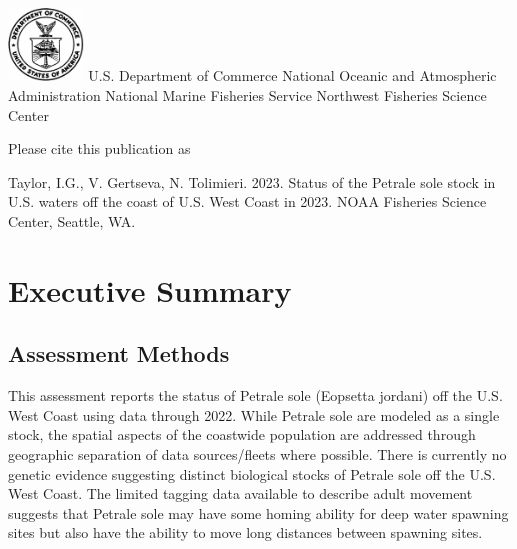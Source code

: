 \documentclass[
]{scrartcl}
\renewcommand*\contentsname{Table of contents}
\newcommand\contentsname{Table of contents}
\begin{document}
\begin{titlepage}
\begin{minipage}[b][\textheight][s]{\textwidth}
  \vspace{1\baselineskip}

  \includegraphics[width=2cm]{support_files/us_doc_logo.png}\newline
  U.S. Department of Commerce\newline
  National Oceanic and Atmospheric Administration\newline
  National Marine Fisheries Service\newline
  Northwest Fisheries Science Center\newline

  \end{minipage}
  \restoregeometry
  \end{titlepage}

\renewcommand*\contentsname{Table of contents}
{
\hypersetup{linkcolor=.}
\setcounter{tocdepth}{3}
\tableofcontents
}
\listoffigures
\listoftables
\newpage{}

Please cite this publication as

Taylor, I.G., V. Gertseva, N. Tolimieri. 2023. Status of the Petrale
sole stock in U.S. waters off the coast of U.S. West Coast in 2023. NOAA
Fisheries Science Center, Seattle, WA.

\newpage{}

\section{Executive Summary}\label{executive-summary}

\subsection{Assessment Methods}\label{assessment-methods}

This assessment reports the status of Petrale sole (Eopsetta jordani)
off the U.S. West Coast using data through 2022. While Petrale sole are
modeled as a single stock, the spatial aspects of the coastwide
population are addressed through geographic separation of data
sources/fleets where possible. There is currently no genetic evidence
suggesting distinct biological stocks of Petrale sole off the U.S. West
Coast. The limited tagging data available to describe adult movement
suggests that Petrale sole may have some homing ability for deep water
spawning sites but also have the ability to move long distances between
spawning sites.
\end{document}
